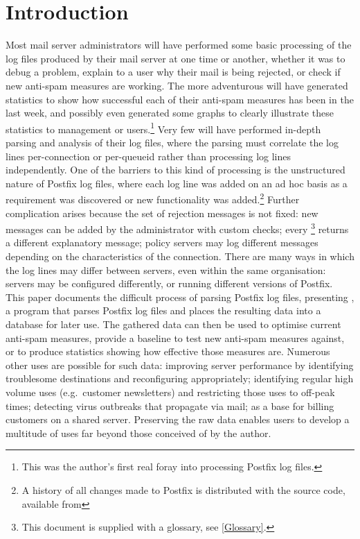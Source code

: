 \chapter{Introduction}

\label{introduction}

Most mail server administrators will have performed some basic processing
of the log files produced by their mail server at one time or another,
whether it was to debug a problem, explain to a user why their mail is
being rejected, or check if new anti-spam measures are working.  The more
adventurous will have generated statistics to show how successful each of
their anti-spam measures has been in the last week, and possibly even
generated some graphs to clearly illustrate these statistics to management
or users.\footnote{This was the author's first real foray into processing
Postfix log files.}  Very few will have performed in-depth parsing and
analysis of their log files, where the parsing must correlate the log lines
per-connection or per-queueid rather than processing log lines
independently.  One of the barriers to this kind of processing is the
unstructured nature of Postfix log files, where each log line was added on
an ad hoc basis as a requirement was discovered or new functionality was
added.\footnote{A history of all changes made to Postfix is distributed
with the source code, available from
} Further complication
arises because the set of rejection messages is not fixed: new messages can
be added by the administrator with custom checks; every
\footnote{This document is supplied with a glossary, see
\textsection\ref{Glossary}.} returns a different explanatory message;
policy servers may log different messages depending on the characteristics
of the connection.  There are many ways in which the log lines may differ
between servers, even within the same organisation: servers may be
configured differently, or running different versions of Postfix.  This
paper documents the difficult process of parsing Postfix log files,
presenting \parsername{}, a program that parses Postfix log files and
places the resulting data into a database for later use.  The gathered data
can then be used to optimise current anti-spam measures, provide a baseline
to test new anti-spam measures against, or to produce statistics showing
how effective those measures are.  Numerous other uses are possible for
such data: improving server performance by identifying troublesome
destinations and reconfiguring appropriately; identifying regular high
volume uses (e.g.\ customer newsletters) and restricting those uses to
off-peak times; detecting virus outbreaks that propagate via mail; as a
base for billing customers on a shared server.  Preserving the raw data
enables users to develop a multitude of uses far beyond those conceived of
by the author.


